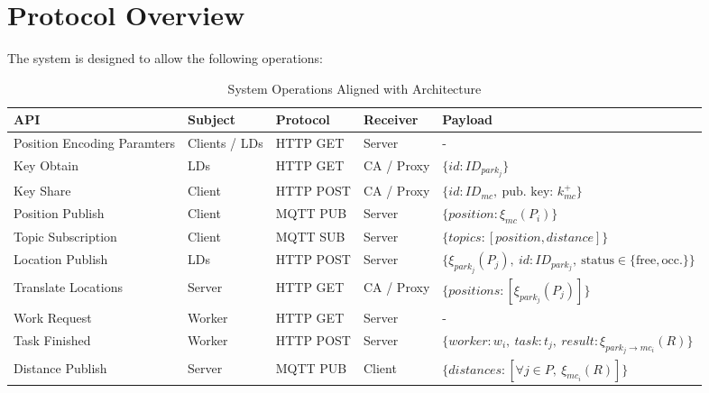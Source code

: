 
\section{Protocol Overview}
The system is designed to allow the following operations:

\begin{table}[h]
\renewcommand{\arraystretch}{1.3}
\small
\begin{tabularx}{\linewidth}{|l|X|X|X|p{4cm}|}
\hline
\textbf{API} & \textbf{Subject} & \textbf{Protocol} & \textbf{Receiver} & \textbf{Payload} \\ \hline

Position Encoding Paramters & Clients / LDs & HTTP GET & Server & - \\ \hline

Key Obtain & LDs & HTTP GET & CA / Proxy & $\{id: ID_{park_j}\}$ \\ \hline

Key Share & Client & HTTP POST & CA / Proxy & $\{id: ID_{mc},\ \text{pub. key: } k_{mc}^+\}$ \\ \hline

Position Publish & Client & MQTT PUB & Server & $\{position: \xi_{mc}(P_i)\}$ \\ \hline

Topic Subscription & Client & MQTT SUB & Server & $\{topics: [position, distance]\}$ \\ \hline

Location Publish & LDs & HTTP POST & Server & $\{\xi_{park_j}(P_j),\ id: ID_{park_j},\ \text{status} \in \{\text{free}, \text{occ.}\}\}$ \\ \hline

Translate Locations & Server & HTTP GET & CA / Proxy & $\{positions: [\xi_{park_j}(P_{j})]\}$ \\ \hline

Work Request & Worker & HTTP GET & Server & - \\ \hline

Task Finished & Worker & HTTP POST & Server & $\{worker: w_i,\ task: t_j,\ result: \xi_{park_j \to mc_i}(R)\}$ \\ \hline

Distance Publish & Server & MQTT PUB & Client & $\{distances: [\forall j \in P,\ \xi_{mc_i}(R)]\}$ \\ \hline

\end{tabularx}
\caption{System Operations Aligned with Architecture}
\label{table:system-operations}
\end{table}

